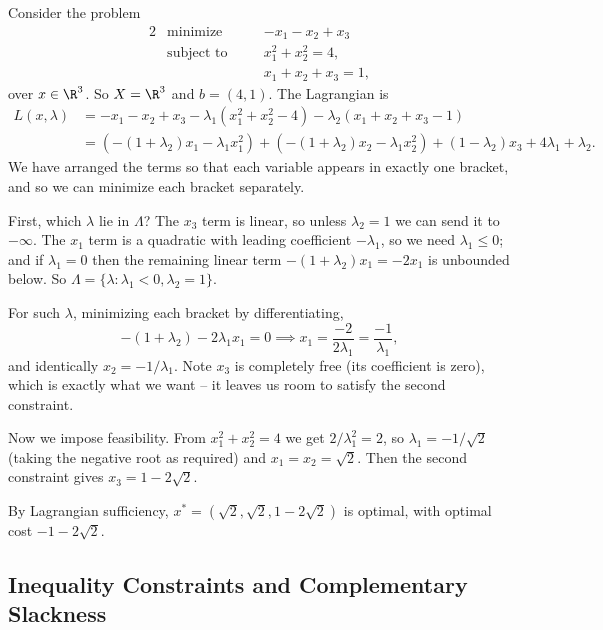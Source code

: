 \documentclass[a4paper]{scrartcl}
\begin{document}
\begin{example}
    Consider the problem
    \begin{alignat*}{2}
        & \text{minimize} \quad && -x_1 - x_2 + x_3 \\
        & \text{subject to} \quad && x_1^2 + x_2^2 = 4, \\
        & && x_1 + x_2 + x_3 = 1,
    \end{alignat*}
    over $x \in \R^3$. So $X = \R^3$ and $b = (4, 1)$. The Lagrangian is
    \begin{align*}
        L(x, \lambda) &= -x_1 - x_2 + x_3 - \lambda_1(x_1^2 + x_2^2 - 4) - \lambda_2(x_1 + x_2 + x_3 - 1)\\
        &= \left(-(1 + \lambda_2)x_1 - \lambda_1 x_1^2\right) + \left(-(1 + \lambda_2)x_2 - \lambda_1 x_2^2\right) + (1 - \lambda_2)x_3 + 4\lambda_1 + \lambda_2.
    \end{align*}
    We have arranged the terms so that each variable appears in exactly one bracket, and so we can minimize each bracket separately.

    First, which $\lambda$ lie in $\Lambda$? The $x_3$ term is linear, so unless $\lambda_2 = 1$ we can send it to $-\infty$. The $x_1$ term is a quadratic with leading coefficient $-\lambda_1$, so we need $\lambda_1 \leq 0$; and if $\lambda_1 = 0$ then the remaining linear term $-(1 + \lambda_2)x_1 = -2x_1$ is unbounded below. So $\Lambda = \{\lambda : \lambda_1 < 0, \lambda_2 = 1\}$.

    For such $\lambda$, minimizing each bracket by differentiating,
    $$
    -(1 + \lambda_2) - 2\lambda_1 x_1 = 0 \implies x_1 = \frac{-2}{2\lambda_1} = \frac{-1}{\lambda_1},
    $$
    and identically $x_2 = -1/\lambda_1$. Note $x_3$ is completely free (its coefficient is zero), which is exactly what we want -- it leaves us room to satisfy the second constraint.

    Now we impose feasibility. From $x_1^2 + x_2^2 = 4$ we get $2/\lambda_1^2 = 2$, so $\lambda_1 = -1/\sqrt{2}$ (taking the negative root as required) and $x_1 = x_2 = \sqrt{2}$. Then the second constraint gives $x_3 = 1 - 2\sqrt{2}$.

    By Lagrangian sufficiency, $x^* = (\sqrt 2, \sqrt2, 1 - 2\sqrt 2)$ is optimal, with optimal cost $-1 - 2\sqrt 2$.
\end{example}

\subsection{Inequality Constraints and Complementary Slackness}
\end{document}
